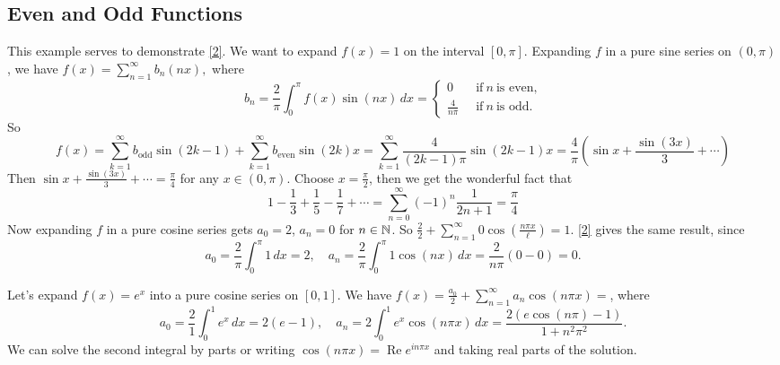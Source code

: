 \subsection{Even and Odd Functions}
\begin{example}
    This example serves to demonstrate \cref{2}. We want to expand $f(x)=1$ on the interval $[0,\pi]$. Expanding $f$ in a pure sine series on $(0,\pi)$, we have $f(x)=\sum_{n=1}^{\infty} b_n \left( nx \right) ,$ where \[
        b_n =\frac{2}{\pi}\int_{0}^{\pi } f(x) \sin \left( nx \right)  \, dx=
        \begin{cases}
            0 \quad &\text{if} \ n \ \text{is even,} \\
            \frac{4}{n\pi}& \text{if} \ n \ \text{is odd.}
        \end{cases}
    \] So \[
    f(x)=\sum_{k=1}^{\infty} b_{\text{odd} }\sin(2k-1)+\sum_{k=1}^{\infty} b_{\text{even} }\sin(2k)x=\sum_{k=1}^{\infty} \frac{4}{(2k-1)\pi}\sin(2k-1)x=\frac{4}{\pi}\left( \sin  x+ \frac{\sin (3x)}{3}+\cdots  \right) 
\] Then $\sin x + \frac{\sin(3x)}{3}+\cdots =\frac{\pi}{4}$ for any $x\in (0,\pi)$. Choose $x=\frac{\pi}{2}$, then we get the wonderful fact that \[
1-\frac{1}{3}+\frac{1}{5}-\frac{1}{7}+\cdots =\sum_{n=0}^{\infty} (-1)^n \frac{1}{2n+1}=\frac{\pi}{4}
\] Now expanding $f$ in a pure cosine series gets $a_0=2$, $a_n =0$ for $n\in \mathbb{N}$. So $\frac{2}{2}+\sum_{n=1}^{\infty} 0 \cos \left( \frac{n\pi x}{\ell} \right) =1.$ \cref{2} gives the same result, since \[
a_0=\frac{2}{\pi}\int_{0}^{\pi}  1\, dx=2,\quad a_n =\frac{2}{\pi}\int_{0}^{\pi} 1 \cos \left( nx \right)  \, dx=\frac{2}{n\pi}(0-0)=0.
\] 
\end{example}
\begin{example}
    Let's expand $f(x)=e^x$ into a pure cosine series on $[0,1]$. We have $f(x)=\frac{a_0}{2}+\sum_{n=1}^{\infty} a_n \cos\left( n\pi x\right) =$, where \[
        a_0=\frac{2}{1}\int_{0}^{1} e^{x} \, dx=2(e-1),\quad a_n =2 \int_{0}^{1} e^x \cos(n\pi x) \, dx=\frac{2(e \cos(n\pi)-1)}{1+n^2\pi^2}.
    \] We can solve the second integral by parts or writing $\cos(n\pi x)=\operatorname{Re}e^{in\pi x}$ and taking real parts of the solution.
\end{example}
